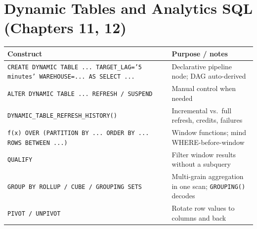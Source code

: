 \section{Dynamic Tables and Analytics SQL (Chapters 11, 12)}
\begin{center}
\footnotesize
\begin{tabular}{@{}p{5.6cm}p{8.6cm}@{}}
\toprule
\textbf{Construct} & \textbf{Purpose / notes} \\
\midrule
\texttt{CREATE DYNAMIC TABLE ... TARGET\_LAG='5 minutes' WAREHOUSE=... AS SELECT ...} & Declarative pipeline node; DAG auto-derived \\
\texttt{ALTER DYNAMIC TABLE ... REFRESH / SUSPEND} & Manual control when needed \\
\texttt{DYNAMIC\_TABLE\_REFRESH\_HISTORY()} & Incremental vs.\ full refresh, credits, failures \\
\texttt{f(x) OVER (PARTITION BY ... ORDER BY ... ROWS BETWEEN ...)} & Window functions; mind WHERE-before-window \\
\texttt{QUALIFY} & Filter window results without a subquery \\
\texttt{GROUP BY ROLLUP / CUBE / GROUPING SETS} & Multi-grain aggregation in one scan; \texttt{GROUPING()} decodes \\
\texttt{PIVOT / UNPIVOT} & Rotate row values to columns and back \\
\bottomrule
\end{tabular}
\end{center}

